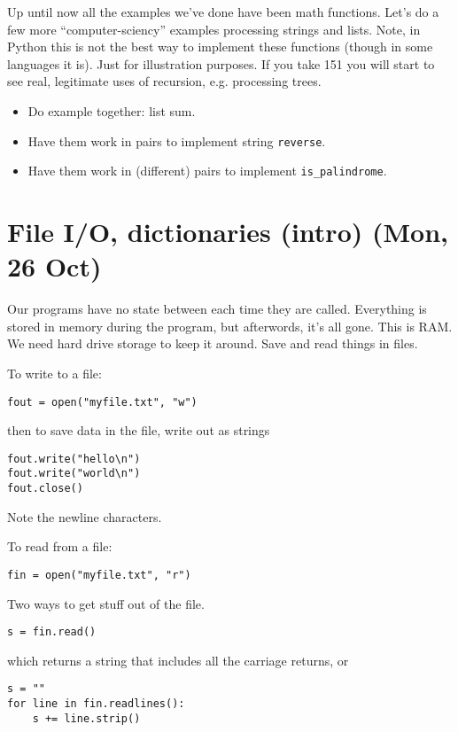 \documentclass{article}
\begin{document}
Up until now all the examples we've done have been math functions.
Let's do a few more ``computer-sciency'' examples processing strings
and lists.  Note, in Python this is not the best way to implement
these functions (though in some languages it is).  Just for
illustration purposes.  If you take 151 you will start to see real,
legitimate uses of recursion, e.g. processing trees.

\begin{itemize}
\item Do example together: list sum.
\item Have them work in pairs to implement string \verb|reverse|.
\item Have them work in (different) pairs to implement \verb|is_palindrome|.
\end{itemize}

\section*{File I/O, dictionaries (intro) (Mon, 26 Oct)}

Our programs have no state between each time they are called.
Everything is stored in memory during the program, but afterwords,
it’s all gone.  This is RAM.  We need hard drive storage to keep it
around.  Save and read things in files.

To write to a file:

\begin{verbatim}
fout = open("myfile.txt", "w")
\end{verbatim}

then to save data in the file, write out as strings

\begin{verbatim}
fout.write("hello\n")
fout.write("world\n")
fout.close()
\end{verbatim}
Note the newline characters.

To read from a file:

\begin{verbatim}
fin = open("myfile.txt", "r")
\end{verbatim}

Two ways to get stuff out of the file.

\begin{verbatim}
s = fin.read()
\end{verbatim}

which returns a string that includes all the carriage returns, or

\begin{verbatim}
s = ""
for line in fin.readlines():
    s += line.strip()
\end{verbatim}
\end{document}
